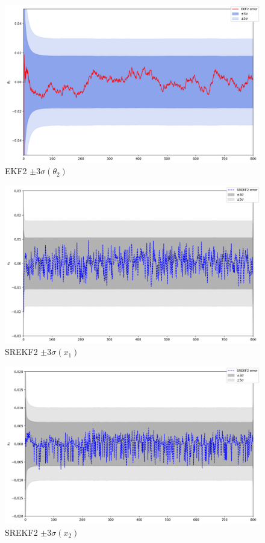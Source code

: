 \documentclass[a4paper,12pt]{article}
\begin{document}
\begin{landscape}
\begin{figure}[p]
\centering
\caption{EKF2 $\pm 3\sigma(\theta_2)$}
\includegraphics[width=0.95\linewidth]{EKF2_err_theta2.png}
\end{figure}

\begin{figure}[p]
\centering
\caption{SREKF2 $\pm 3\sigma(x_1)$}
\includegraphics[width=0.95\linewidth]{SREKF2_err_x1.png}
\end{figure}

\begin{figure}[p]
\centering
\caption{SREKF2 $\pm 3\sigma(x_2)$}
\includegraphics[width=0.95\linewidth]{SREKF2_err_x2.png}
\end{figure}


\end{landscape}
\end{document}
